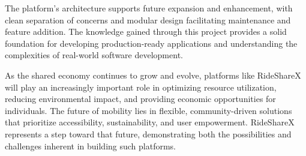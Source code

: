 \documentclass[12pt,a4paper]{report}
\begin{document}
	The platform's architecture supports future expansion and enhancement, with clean separation of concerns and modular design facilitating maintenance and feature addition. The knowledge gained through this project provides a solid foundation for developing production-ready applications and understanding the complexities of real-world software development.
	
	As the shared economy continues to grow and evolve, platforms like RideShareX will play an increasingly important role in optimizing resource utilization, reducing environmental impact, and providing economic opportunities for individuals. The future of mobility lies in flexible, community-driven solutions that prioritize accessibility, sustainability, and user empowerment. RideShareX represents a step toward that future, demonstrating both the possibilities and challenges inherent in building such platforms.
	
	
	
	
\end{document}
